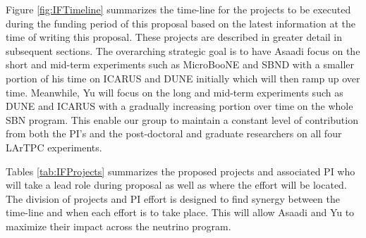 Figure \ref{fig:IFTimeline} summarizes the time-line for the projects to be executed during the funding period of this proposal based on the latest information at the time of writing this proposal. These projects are described in greater detail in subsequent sections. The overarching strategic goal is to have Asaadi focus on the short and mid-term experiments such as MicroBooNE and SBND with a smaller portion of his time on ICARUS and DUNE initially which will then ramp up over time. Meanwhile, Yu will focus on the long and mid-term experiments such as DUNE and ICARUS with a gradually increasing portion over time on the whole SBN program. This enable our group to maintain a constant level of contribution from both the PI's and the post-doctoral and graduate researchers on all four LArTPC experiments.

Tables \ref{tab:IFProjects} summarizes the proposed projects and associated PI who will take a lead role during proposal as well as where the effort will be located. The division of projects and PI effort is designed to find synergy between the time-line and when each effort is to take place. This will allow Asaadi and Yu to maximize their impact across the neutrino program. 

